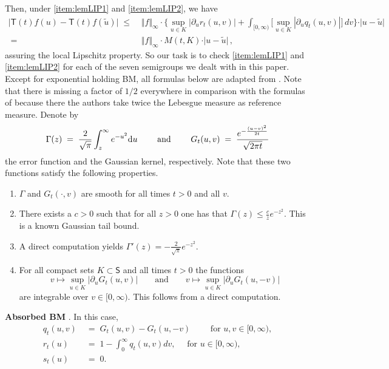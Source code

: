 \documentclass[12pt,a4paper]{article}
\theoremstyle{plain}
\theoremstyle{remark}
\newcommand{\dd}{\text{\rm d}}
\newcommand{\msf}[1]{{\mathsf #1}}
\newcommand{\p}{\partial}
\begin{document}
	Then, under \ref{item:lemLIP1} and \ref{item:lemLIP2}, we have 
	\begin{align*}
		\vert  \msf{T}(t)f (u) - \msf{T}(t)f (\tilde{u}) \vert 
		\;\leq\; & \Vert f\Vert_\infty \cdot \bigg\{\sup_{u\in K} \vert \partial_u r_t(u,v)\vert +  \int_{[0,\infty)}\Big[\sup_{u\in K} |\p_u q_t(u,v)|\Big] \,dv   \bigg\} \cdot \vert u-\tilde{u}\vert \\
		\; = \; &\Vert f\Vert_\infty \cdot M(t, K) \cdot \vert u-\tilde{u}\vert\,,
	\end{align*}
	assuring the local Lipschitz property. So our task is to check \ref{item:lemLIP1} and \ref{item:lemLIP2} for each of the seven semigroups we dealt with in this paper. Except for exponential holding BM, all formulas below are adapted from \cite[Appendix~1]{handbook}. Note that there is missing a factor of $1/2$ everywhere in comparison with the formulas of \cite{handbook} because there  the authors take  twice the Lebesgue measure as reference measure.  Denote by 
	\begin{equation*}
		\Gamma(z) \;=\; \frac{2}{\sqrt{\pi}}\int_z^\infty e^{-u^2}\dd u \qquad \text{ and } \qquad G_t(u,v) \;=\; \frac{e^{-\frac{(u-v)^2}{2t}}}{\sqrt{2\pi t}} 
	\end{equation*}
	the error function and the Gaussian kernel, respectively. 
	Note that these two functions satisfy the following properties.
	\begin{enumerate}[label=(\roman*)]
		\item \label{(i)} $\Gamma$ and $G_t(\cdot,v)$ are smooth for all times $t>0$ and all $v$. 
		\item \label{(ii)} There exists a $c>0$ such that for all $z>0$ one has that $\Gamma(z)\leq \tfrac{c}{z} e^{-z^2}$. This is a known Gaussian tail bound.
		\item \label{(iii)} A direct computation yields $\Gamma'(z)=-\tfrac{2}{\sqrt{\pi}}e^{-z^2}$.
		\item \label{(iv)} For all compact sets $K\subset \msf{S}$ and all times $t>0$ the functions
		\begin{equation*}
			v\mapsto \sup_{u\in K} |\partial_u G_t(u,v)|\qquad\text{and}\qquad v\mapsto \sup_{u\in K} |\partial_u G_t(u,-v)|
		\end{equation*}
		are integrable over $v\in[0,\infty)$. This follows from a direct computation.
	\end{enumerate}
	
	
	\textbf{Absorbed BM} \cite[Page 121]{handbook}. In this case,  
	\begin{align*}
		{q}_t(u,v) & \;=\; G_t(u,v) -  G_t(u,- v)
		\qquad \text{ for }u,v\in [0,\infty),\\
		{r}_t(u) & \;=\; 1-  \int_0^\infty q_t(u,v)dv, \quad \text{ for } u\in [0,\infty),\\
		{s}_t(u) & \;=\; 0.
	\end{align*}
	
\end{document}

